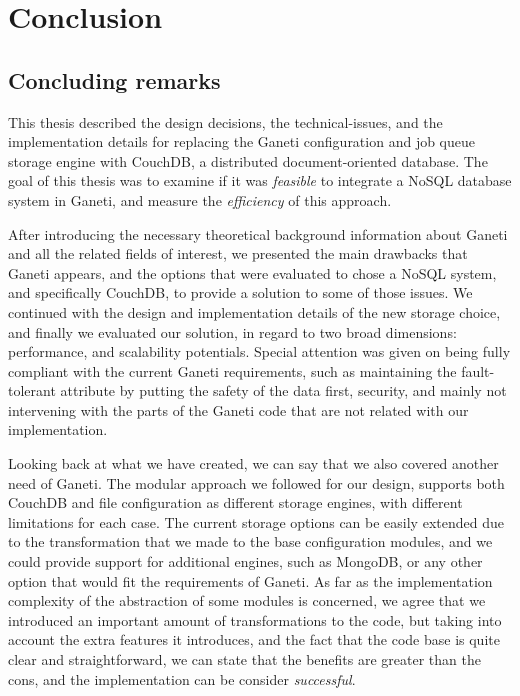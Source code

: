 \chapter{Conclusion}\label{ch:conclusion}

\section{Concluding remarks}\label{sec:remarks}

This thesis described the design decisions, the technical-issues, and the
implementation details for replacing the Ganeti configuration and job queue
storage engine with CouchDB, a distributed document-oriented database. The goal
of this thesis was to examine if it was \emph{feasible} to integrate a NoSQL
database system in Ganeti, and measure the \emph{efficiency} of this approach.

After introducing the necessary theoretical background information about
Ganeti and all the related fields of interest, we presented the main drawbacks
that Ganeti appears, and the options that were evaluated to chose a NoSQL
system, and specifically CouchDB, to provide a solution to some of those issues.
We continued with the design and implementation details of the new storage
choice, and finally we evaluated our solution, in regard to two broad
dimensions: performance, and scalability potentials. Special attention was given
on being fully compliant with the current Ganeti requirements, such as
maintaining the fault-tolerant attribute by putting the safety of the data
first, security, and mainly not intervening with the parts of the Ganeti code
that are not related with our implementation.

Looking back at what we have created, we can say that we also covered another
need of Ganeti. The modular approach we followed for our design, supports both
CouchDB and file configuration as different storage engines, with different
limitations for each case. The current storage options can be easily extended
due to the transformation that we made to the base configuration modules, and we
could provide support for additional engines, such as MongoDB, or any other
option that would fit the requirements of Ganeti. As far as the implementation
complexity of the abstraction of some modules is concerned, we agree that we
introduced an important amount of transformations to the code, but taking into
account the extra features it introduces, and the fact that the code base is
quite clear and straightforward, we can state that the benefits are greater than
the cons, and the implementation can be consider \emph{successful}.

